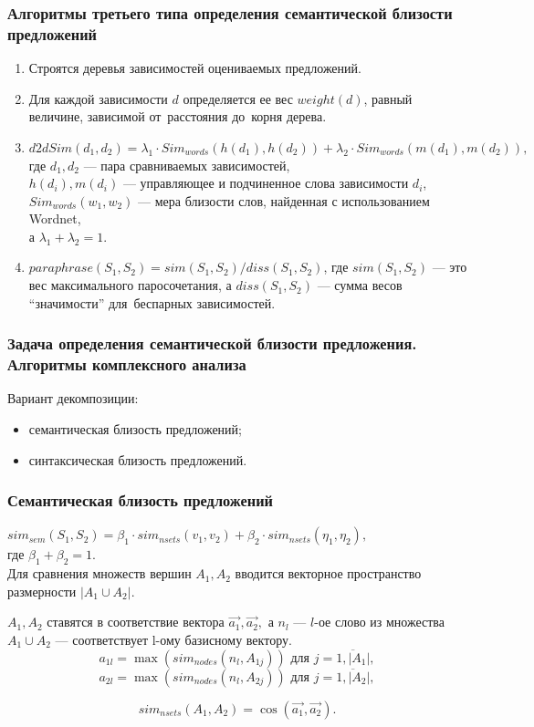 \documentclass{beamer}
\begin{document}
\begin{frame}
\frametitle{Алгоритмы третьего типа определения семантической близости предложений}

\begin{enumerate}

\item {
Строятся деревья зависимостей оцениваемых предложений.
}

\item {
Для каждой зависимости $d$ определяется ее  вес $weight(d)$, равный величине,  
зависимой от~расстояния до~корня дерева.
}

\item{
$d2dSim(d_1,d_2) = \lambda_1 \cdot Sim_{words}(h(d_1),h(d_2)) + \lambda_2 \cdot Sim_{words}(m(d_1),m(d_2)), $
где $d_1, d_2$ --- пара сравниваемых зависимостей,\\
$h(d_i), m(d_i)$ --- управляющее и подчиненное слова зависимости $d_i$,\\
$Sim_{words}(w_1,w_2)$ --- мера близости слов, найденная с использованием Wordnet,\\
а $\lambda_1 + \lambda_2 = 1$.
}

\item{
$paraphrase(S_1, S_2) = sim(S_1,S_2)/diss(S_1, S_2)$, 
где $sim(S_1, S_2)$ --- это вес максимального паросочетания,
а $diss(S_1, S_2)$ --- сумма весов ``значимости'' для~беспарных зависимостей.
}
\end{enumerate}

\end{frame}

\begin{frame}
\frametitle{Задача определения семантической близости предложения. Алгоритмы комплексного анализа}

Вариант декомпозиции:
\begin{itemize}
\item{
семантическая близость предложений;
}
\item{
синтаксическая близость предложений.
}
\end{itemize}

\end{frame}

\begin{frame}
\frametitle{Семантическая близость предложений}

$sim_{sem}(S_1 , S_2) = \beta_1 \cdot sim_{nsets}(v_1, v_2) + \beta_2 \cdot sim_{nsets}(\eta_1, \eta_2), $\\
где
$\beta_1 + \beta_2 = 1$.\\
\vspace{0.5cm}
Для сравнения множеств вершин $A_1,A_2$ вводится векторное пространство размерности $|A_1 \cup A_2|$.

$A_1,A_2$ ставятся в соответствие вектора $\vec{a_1},\vec{a_2}, $ 
а $n_l$ --- $l$-ое слово из множества $A_1 \cup A_2$ --- соответствует l-ому базисному вектору.
$$a_{1l} = \max(sim_{nodes}(n_l, A_{1j})) \text{ для } j=\overline{1,|A_1|},$$
$$a_{2l} = \max(sim_{nodes}(n_l, A_{2j})) \text{ для } j=\overline{1,|A_2|},$$

$$ sim_{nsets}(A_1,A_2) = \cos\left(\vec{a_1},\vec{a_2}\right). $$

\end{frame}
\end{document}

